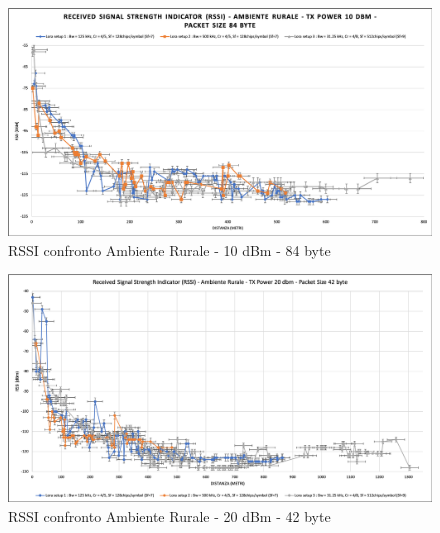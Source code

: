 \documentclass[12pt,a4paper,openright,twoside]{report}
\begin{document}
\begin{figure}[h]                      
\begin{center} 
\includegraphics[width=\textwidth]{RSSI_confronto_AR-10dBm-84byte.png}
\caption[RSSI confronto Ambiente Rurale - 10 dBm - 84 byte]{RSSI confronto Ambiente Rurale - 10 dBm - 84 byte}\label{fig:prima}
\end{center}
\end{figure}

\begin{figure}[h]                      
\begin{center} 
\includegraphics[width=\textwidth]{RSSI_confronto_AR_20dBm-42byte.png}
\caption[RSSI confronto Ambiente Rurale - 20 dBm - 42 byte]{RSSI confronto Ambiente Rurale - 20 dBm - 42 byte}\label{fig:prima}
\end{center}
\end{figure}
\end{document}
